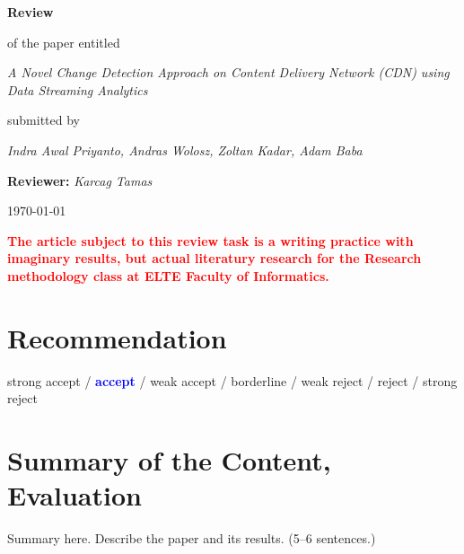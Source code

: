 \documentclass[a4paper,12pt]{article}
\begin{document}
\setcounter{secnumdepth}{0}
\setlength{\parindent}{0cm}

\newcommand{\score}[1]{\hfill\textit{(#1~points)}}
\newcommand{\select}[1]{{\Large\textbf{\textcolor{blue}{#1}}}}




\begin{center}
{\LARGE \textbf{Review}}
\bigskip

of the paper entitled
\medskip

{\large \textit{A Novel Change Detection Approach on Content Delivery Network (CDN) using Data Streaming Analytics}}
\medskip

submitted by
\medskip

{\large \textit{Indra Awal Priyanto, Andras Wolosz, Zoltan Kadar, Adam Baba}}

\bigskip

{\large \textbf{Reviewer:} \textit{Karcag Tamas}}
\medskip

\today

\end{center}

\vspace{1cm}


{\footnotesize\textcolor{red}{\textbf{The article subject to this review task is a writing practice with imaginary results, but actual literatury research for the Research methodology class at ELTE Faculty of Informatics.}}}



\section{Recommendation}

strong accept / \select{accept} / weak accept / borderline / weak reject / reject / strong reject


\section{Summary of the Content, Evaluation}

Summary here. Describe the paper and its results. (5--6 sentences.)
\bigskip

\end{document}
